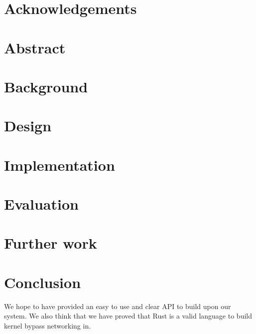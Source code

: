 \documentclass[11pt]{book}
\begin{document}
\chapter*{Acknowledgements}

\tableofcontents

\setcounter{page}{1}

\chapter*{Abstract}



\chapter{Background}



\chapter{Design}



\chapter{Implementation}



\chapter{Evaluation}



\chapter{Further work}



\chapter{Conclusion}

We hope to have provided an easy to use and clear API to build upon
our system. We also think that we have proved that Rust is a valid
language to build kernel bypass networking in. 


{}
\end{document}
